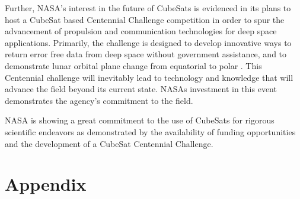 \documentclass[11pt]{article}
\begin{document}
Further, NASA’s interest in the future of CubeSats is evidenced in its plans to host a CubeSat based Centennial Challenge competition in order to spur the advancement of propulsion and communication technologies for deep space applications. Primarily, the challenge is designed to develop innovative ways to return error free data from deep space without government assistance, and to demonstrate lunar orbital plane change from equatorial to polar \cite{solicitation}. This Centennial challenge will inevitably lead to technology and knowledge that will advance the field beyond its current state. NASAs investment in this event demonstrates the agency’s commitment to the field. 

NASA is showing a great commitment to the use of CubeSats for rigorous scientific endeavors as demonstrated by the availability of funding opportunities and the development of a CubeSat Centennial Challenge. 

\section{Appendix}
\end{document}
